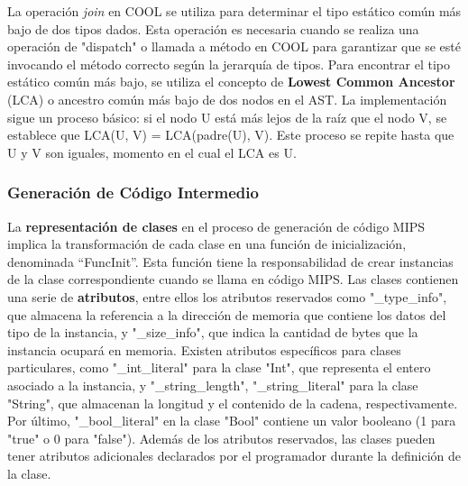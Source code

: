 \documentclass[10pt]{article} %
\begin{document}
	La operación \textit{join} en COOL se utiliza para determinar el tipo estático común más bajo de dos tipos dados. Esta operación es necesaria cuando se realiza una operación de "dispatch" o llamada a método en COOL para garantizar que se esté invocando el método correcto según la jerarquía de tipos. Para encontrar el tipo estático común más bajo, se utiliza el concepto de \textbf{Lowest Common Ancestor} (LCA) o ancestro común más bajo de dos nodos en el AST. La implementación sigue un proceso básico: si el nodo U está más lejos de la raíz que el nodo V, se establece que LCA(U, V) = LCA(padre(U), V). Este proceso se repite hasta que U y V son iguales, momento en el cual el LCA es U. 
	
%
%	
%	
%	
%	
	
	\subsubsection{Generaci\'on de C\'odigo Intermedio}
	
	La \textbf{representación de clases} en el proceso de generación de código MIPS implica la transformación de cada clase en una función de inicialización, denominada ``FuncInit''. Esta función tiene la responsabilidad de crear instancias de la clase correspondiente cuando se llama en código MIPS. Las clases contienen una serie de \textbf{atributos}, entre ellos los atributos reservados como "\_type\_info", que almacena la referencia a la dirección de memoria que contiene los datos del tipo de la instancia, y "\_size\_info", que indica la cantidad de bytes que la instancia ocupará en memoria. Existen atributos específicos para clases particulares, como "\_int\_literal" para la clase "Int", que representa el entero asociado a la instancia, y "\_string\_length", "\_string\_literal" para la clase "String", que almacenan la longitud y el contenido de la cadena, respectivamente. Por último, "\_bool\_literal" en la clase "Bool" contiene un valor booleano (1 para "true" o 0 para "false"). Además de los atributos reservados, las clases pueden tener atributos adicionales declarados por el programador durante la definición de la clase.
	
\end{document}
